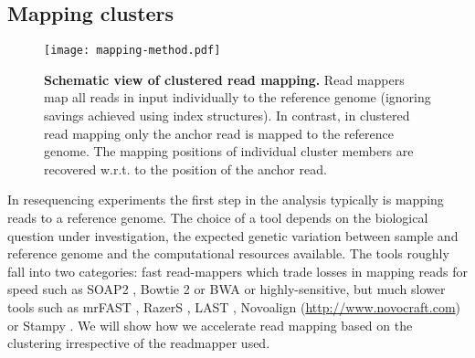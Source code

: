 \documentclass[a4paper]{article}
\begin{document}
\subsection{Mapping clusters}

\begin{figure}
\centering
\texttt{[image: mapping-method.pdf]}
\caption{\label{fig:mapping-method}
{\bf Schematic view of clustered read mapping.}
Read mappers map all reads in input individually to the reference genome
  (ignoring savings achieved using index structures). In contrast,
  in clustered read mapping only the anchor read is mapped to the
  reference genome. The mapping positions of individual cluster members
  are recovered w.r.t. to the position of the anchor read.
}
\vspace{-4mm}
\end{figure}

In resequencing experiments the first step in the analysis typically
is mapping reads to a reference genome. The choice of a tool
depends on the biological question under investigation, the expected
genetic variation between sample and reference genome and the
computational resources available. The tools roughly fall into two
categories: fast read-mappers which trade losses in mapping
reads
for speed such as
SOAP2 \cite{Li01082009},
Bowtie 2 \cite{Langmead2012} or
BWA \cite{Li15072009}
or highly-sensitive, but much slower tools such as
mrFAST \cite{Alkan_mrFAST},
RazerS \cite{Weese01092009},
LAST \cite{Frith01042010},
Novoalign (\url{http://www.novocraft.com}) or
Stampy \cite{Lunter2011}.
We will show
how we accelerate read mapping based on the clustering irrespective of
the readmapper used.
\end{document}
